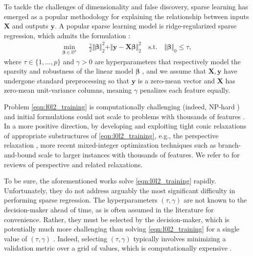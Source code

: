 \documentclass[ijoc,noblindrev]{informs3} %
\newcommand{\ag}[1]{{\color{black}#1}}
\begin{document}
To tackle the challenges of dimensionality and false discovery, sparse learning has emerged as a popular methodology for explaining the relationship between inputs {\color{black}$\bm{X}$} and outputs {\color{black}$\bm{y}$}. %
A popular sparse learning model is ridge-regularized sparse regression, which admits the formulation \citep[][]{bertsimas2020sparse,xie2020scalable, hastie2020best,  atamturk2020safe, kenney2021mip, hazimeh2021sparse, liu2023okridge}:
\begin{align}\label{eqn:l0l2_training}
    \min_{\bm{\beta} \in \mathbb{R}^p} \quad &  \frac{\gamma}{2} \Vert \bm{\beta}\Vert_2^2+\Vert \bm{y}-\bm{X}\bm{\beta}\Vert_2^2  \quad \text{s.t.} \quad \Vert \bm{\beta}\Vert_0 \leq \tau,
\end{align} 
where $\tau \in \{1, \ldots, p\}$ and $\gamma >0$ are hyperparameters that respectively model the sparsity and robustness of the linear model $\bm{\beta}$ \citep[cf.][]{xu2008robust, bertsimas2018characterization}, and we assume %
that $\bm{X}, \bm{y}$ have undergone standard preprocessing so that $\bm{y}$ is a zero-mean vector and $\bm{X}$ has zero-mean unit-variance columns, meaning $\gamma$ penalizes each feature equally.


Problem \eqref{eqn:l0l2_training} is \ag{computationally} challenging {\color{black}(indeed, NP-hard \cite{natarajan1995sparse})} and initial formulations could not scale to problems with thousands of features \citep[][]{hastie2020best}. In a more positive direction, by developing and exploiting tight conic relaxations of appropriate substructures of \eqref{eqn:l0l2_training}, e.g., the perspective relaxation \citep{ceria1999convex, stubbs1999branch, gunluk2010perspective}%
, more recent mixed-integer optimization techniques such as branch-and-bound \citep{hazimeh2021sparse} scale to larger instances with thousands of %
features. {\color{black}We refer to \cite{bertsimas2021unified, atamturk2019rank} for reviews of perspective and related relaxations.}

To be sure, the aforementioned works solve \eqref{eqn:l0l2_training} rapidly. Unfortunately, they do not address arguably the most significant difficulty {\color{black}in performing sparse regression}. The hyperparameters $(\tau, \gamma)$ 
{\color{black}are not known to the decision-maker ahead of time, as is often assumed in the literature for convenience.}
Rather, they must be selected by {\color{black}the decision-maker}, which is potentially much more challenging than solving \eqref{eqn:l0l2_training} for a single value of $(\tau, \gamma)$ \citep[]{hansen1992new}. Indeed, selecting $(\tau, \gamma)$ typically involves minimizing a validation metric over a grid of values, which is computationally expensive \citep[]{larochelle2007empirical}. 
\end{document}
